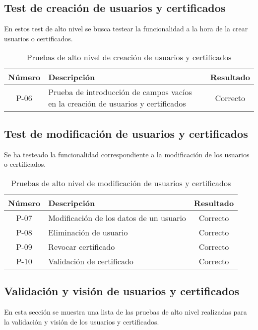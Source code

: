 \subsection{Test de creación de usuarios y certificados}
En estos test de alto nivel se busca testear la funcionalidad a la hora de la crear usuarios o certificados.

\begin{table}[!h]
	\begin{center}
		\begin{tabular}{|c|p{6cm}|c|}
		\hline \textbf{Número} & \textbf{Descripción} & \textbf{Resultado}\\ 
		\hline P-06 & Prueba de introducción de campos vacíos en la creación de usuarios y certificados & Correcto \\
		\hline 
		\end{tabular}
		\caption{Pruebas de alto nivel de creación de usuarios y certificados}
		\label{tab:createTest}
	\end{center}
\end{table}

\subsection{Test de modificación de usuarios y certificados}
Se ha testeado la funcionalidad correspondiente a la modificación de los usuarios o certificados.

\begin{table}[!h]
	\begin{center}
		\begin{tabular}{|c|p{6cm}|c|}
				\hline \textbf{Número} & \textbf{Descripción} & \textbf{Resultado}\\ 
				\hline P-07 & Modificación de los datos de un usuario & Correcto \\
				\hline P-08 & Eliminación de usuario & Correcto \\
				\hline P-09 & Revocar certificado & Correcto \\
				\hline P-10 & Validación de certificado & Correcto \\
				\hline 
		\end{tabular}
		\caption{Pruebas de alto nivel de modificación de usuarios y certificados}
		\label{tab:modifyTest}
	\end{center}
\end{table}

\subsection{Validación y visión de usuarios y certificados}
En esta sección se muestra una lista de las pruebas de alto nivel realizadas para la validación y visión de los usuarios y certificados.

